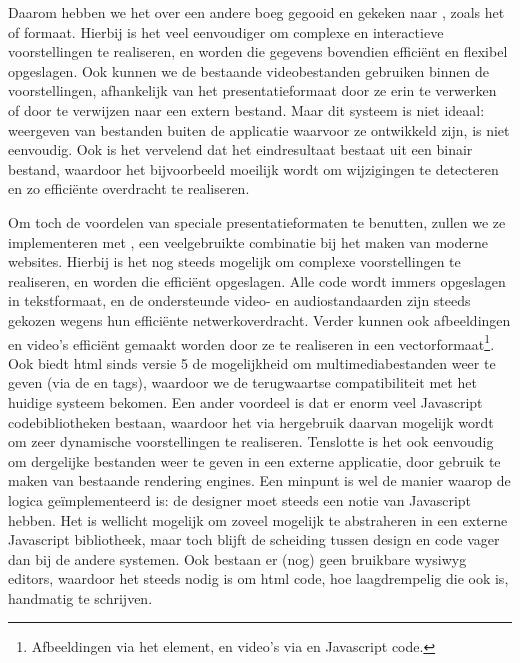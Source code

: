 Daarom hebben we het over een andere boeg gegooid en gekeken naar , zoals het  of  formaat. Hierbij is het veel eenvoudiger om complexe en interactieve voorstellingen te realiseren, en worden die gegevens bovendien efficiënt en flexibel opgeslagen. Ook kunnen we de bestaande videobestanden gebruiken binnen de voorstellingen, afhankelijk van het presentatieformaat door ze erin te verwerken of door te verwijzen naar een extern bestand. Maar dit systeem is niet ideaal: weergeven van bestanden buiten de applicatie waarvoor ze ontwikkeld zijn, is niet eenvoudig. Ook is het vervelend dat het eindresultaat bestaat uit een binair bestand, waardoor het bijvoorbeeld moeilijk wordt om wijzigingen te detecteren en zo efficiënte overdracht te realiseren.

Om toch de voordelen van speciale presentatieformaten te benutten, zullen we ze implementeren met , een veelgebruikte combinatie bij het maken van moderne websites. Hierbij is het nog steeds mogelijk om complexe voorstellingen te realiseren, en worden die efficiënt opgeslagen. Alle code wordt immers opgeslagen in tekstformaat, en de ondersteunde video- en audiostandaarden zijn steeds gekozen wegens hun efficiënte netwerkoverdracht. Verder kunnen ook afbeeldingen en video's efficiënt gemaakt worden door ze te realiseren in een vectorformaat\footnote{Afbeeldingen via het  element, en video's via  en Javascript code.}. Ook biedt \ac{html} sinds versie 5 de mogelijkheid om multimediabestanden weer te geven (via de  en  tags), waardoor we de terugwaartse compatibiliteit met het huidige systeem bekomen. Een ander voordeel is dat er enorm veel Javascript codebibliotheken bestaan, waardoor het via hergebruik daarvan mogelijk wordt om zeer dynamische voorstellingen te realiseren. Tenslotte is het ook eenvoudig om dergelijke bestanden weer te geven in een externe applicatie, door gebruik te maken van bestaande rendering engines. Een minpunt is wel de manier waarop de logica geïmplementeerd is: de designer moet steeds een notie van Javascript hebben. Het is wellicht mogelijk om zoveel mogelijk te abstraheren in een externe Javascript bibliotheek, maar toch blijft de scheiding tussen design en code vager dan bij de andere systemen. Ook bestaan er (nog) geen bruikbare \ac{wysiwyg} editors, waardoor het steeds nodig is om \ac{html} code, hoe laagdrempelig die ook is, handmatig te schrijven.

